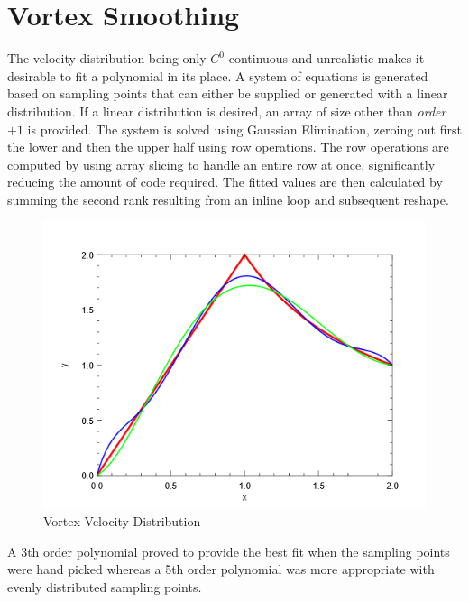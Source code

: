 \documentclass[12pt,twocolumn]{article}
\begin{document}
\section*{Vortex Smoothing}
The velocity distribution being only $C^0$ continuous and unrealistic makes it desirable to fit a polynomial in its place. A system of equations is generated based on sampling points that can either be
supplied or generated with a linear distribution. If a linear distribution is desired, an array of size other than \emph{order$+1$} is provided. 
The system is solved using Gaussian Elimination, zeroing out first the lower and then the upper half using row operations.
The row operations are computed by using array slicing to handle an entire row at once, significantly reducing the amount of code required. The fitted values are then calculated by summing the second rank resulting from an inline loop and subsequent reshape.
\begin{figure}
\includegraphics[width=\columnwidth]{vortexvel.png}
\footnotesize{\caption{Vortex Velocity Distribution}}
\end{figure}
A 3th order polynomial proved to provide the best fit when the sampling points were hand picked whereas a 5th order polynomial was more appropriate with evenly distributed sampling points.
\end{document}
